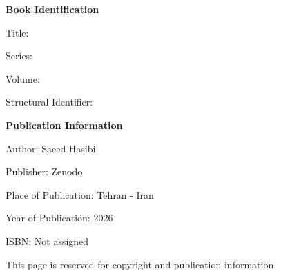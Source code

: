 
\thispagestyle{empty}

\begin{center}

    \vspace*{3cm}

    {\large\bfseries \BookTitle\par}

    \vspace{0.5cm}

    {\normalsize \SystemName\par}

    \vspace{2cm}

\end{center}

\noindent
\textbf{Book Identification}

\vspace{0.3cm}

\noindent
Title: \BookFullTitle

\noindent
Series: \BookSeriesTitle

\noindent
Volume: \BookNumber

\noindent
Structural Identifier: \BookStructuralID

\vspace{1.5cm}

\noindent
\textbf{Publication Information}

\vspace{0.3cm}

\noindent
Author: Saeed Hasibi

\noindent
Publisher: Zenodo

\noindent
Place of Publication: Tehran - Iran

\noindent
Year of Publication: 2026

\noindent
ISBN: Not assigned

\vfill

\begin{center}

    {\small
    This page is reserved for copyright and publication
    information.
    \par}

\end{center}

\clearpage

